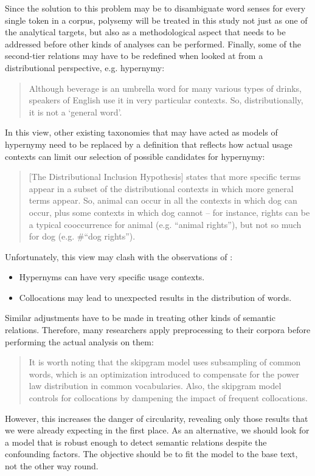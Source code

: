 \documentclass[jou]{apa6} %
\begin{document}
Since the solution to this problem may be to disambiguate word senses for every single token in a corpus, polysemy will be treated in this study not just as one of the analytical targets, but also as a methodological aspect that needs to be addressed before other kinds of analyses can be performed. Finally, some of the second-tier relations may have to be redefined when looked at from a distributional perspective, e.g. hypernymy:
\blockquote[{\cite[p.~443]{herbelotMeasuringSemanticContent2013}}]{Although beverage is an umbrella word for many various types of drinks, speakers of English use it in very particular contexts. So, distributionally, it is not a ‘general word’.}
In this view, other existing taxonomies that may have acted as models of hypernymy need to be replaced by a definition that reflects how actual usage contexts can limit our selection of possible candidates for hypernymy:
\blockquote[{\cite[p.~443]{rollerInclusiveSelectiveSupervised2014}}]{[The Distributional Inclusion Hypothesis] states that more specific terms appear in a subset of the distributional contexts in which more general terms appear. So, animal can occur in all the contexts in which dog can occur, plus some contexts in which dog cannot – for instance, rights can be a typical cooccurrence for animal (e.g. “animal rights”), but not so much for dog (e.g. \#“dog rights”).}
Unfortunately, this view may clash with the observations of \cite{herbelotMeasuringSemanticContent2013}:
\begin{itemize}
      \item Hypernyms can have very specific usage contexts.
      \item Collocations may lead to unexpected results in the distribution of words.
\end{itemize}
Similar adjustments have to be made in treating other kinds of semantic relations. Therefore, many researchers apply preprocessing to their corpora before performing the actual analysis on them:
\blockquote[{\cite[p.~56f.]{gyllenstenRgramsUnsupervisedLearning2019}}]{It is worth noting that the skipgram model uses subsampling of common words, which is an optimization introduced to compensate for the power law distribution in common vocabularies. Also, the skipgram model controls for collocations by dampening the impact of frequent collocations.}
However, this increases the danger of circularity, revealing only those results that we were already expecting in the first place. As an alternative, we should look for a model that is robust enough to detect semantic relations despite the confounding factors. The objective should be to fit the model to the base text, not the other way round. 
\end{document}
